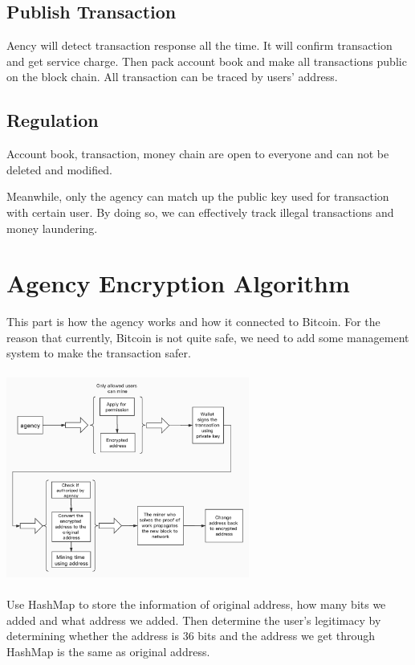 \documentclass[conference]{IEEEtran}
\begin{document}
\subsection{Publish Transaction}
Aency will detect transaction response all the time. It will confirm transaction and get service charge. Then pack account book and make all transactions public on the block chain. All transaction can be traced by users' address. 

\subsection{Regulation}
Account book, transaction, money chain are open to everyone and can not be deleted and modified.

Meanwhile, only the agency can match up the public key used for transaction with certain user. By doing so, we can effectively track illegal  transactions and money laundering.

\section{Agency Encryption Algorithm}
This part is how the agency works and how it connected to Bitcoin. For the reason that currently, Bitcoin is not quite safe, we need to add some management system to make the transaction safer.
\\
\\
\includegraphics[width=8cm]{xintang He.png}
\\
\\

Use HashMap to store the information of original address, how many bits we added and what address we added. Then determine the user's legitimacy by determining whether the address is 36 bits and the address we get through HashMap is the same as original address.
\end{document}

